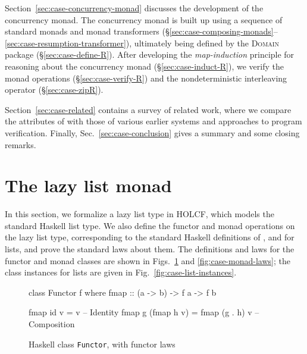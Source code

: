 Section~\ref{sec:case-concurrency-monad} discusses the development of the concurrency monad. The concurrency monad is built up using a sequence of standard monads and monad transformers (\S\ref{sec:case-composing-monads}--\ref{sec:case-resumption-transformer}), ultimately being defined by the \textsc{Domain} package (\S\ref{sec:case-define-R}). After developing the \emph{map-induction} principle for reasoning about the concurrency monad (\S\ref{sec:case-induct-R}), we verify the monad operations (\S\ref{sec:case-verify-R}) and the nondeterministic interleaving operator (\S\ref{sec:case-zipR}).

Section~\ref{sec:case-related} contains a survey of related work, where we compare the attributes of  with those of various earlier systems and approaches to program verification. Finally, Sec.~\ref{sec:case-conclusion} gives a summary and some closing remarks.

\section{The lazy list monad}
\label{sec:case-lazy-list}

In this section, we formalize a lazy list type in HOLCF, which models the standard Haskell list type. We also define the functor and monad operations on the lazy list type, corresponding to the standard Haskell definitions of ,  and \hs{(>{}>=)} for lists, and prove the standard laws about them. The definitions and laws for the functor and monad classes are shown in Figs.~\ref{fig:case-functor-laws} and \ref{fig:case-monad-laws}; the class instances for lists are given in Fig.~\ref{fig:case-list-instances}.

\begin{figure}
\begin{center}
\begin{minipage}{0.90\textwidth}
\begin{hscode}
class Functor f where
  fmap :: (a -> b) -> f a -> f b
\end{hscode}
\begin{hscode}
        fmap id v = v               -- Identity
fmap g (fmap h v) = fmap (g . h) v  -- Composition
\end{hscode}
\end{minipage}
\end{center}
\caption{Haskell class \texttt{Functor}, with functor laws}
\label{fig:case-functor-laws}
\end{figure}

